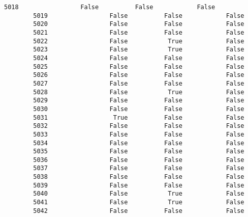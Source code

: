 \documentclass[11pt]{article}
\begin{document}
\begin{Verbatim}[commandchars=\\\{\}]
        5018                 False          False            False   
        5019                 False          False            False   
        5020                 False          False            False   
        5021                 False          False            False   
        5022                 False           True            False   
        5023                 False           True            False   
        5024                 False          False            False   
        5025                 False          False            False   
        5026                 False          False            False   
        5027                 False          False            False   
        5028                 False           True            False   
        5029                 False          False            False   
        5030                 False          False            False   
        5031                  True          False            False   
        5032                 False          False            False   
        5033                 False          False            False   
        5034                 False          False            False   
        5035                 False          False            False   
        5036                 False          False            False   
        5037                 False          False            False   
        5038                 False          False            False   
        5039                 False          False            False   
        5040                 False           True            False   
        5041                 False           True            False   
        5042                 False          False            False   
        

\end{Verbatim}
\end{document}
